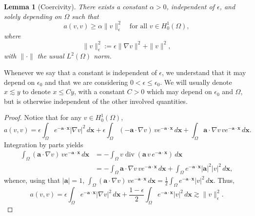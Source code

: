 \documentclass{article}
\newtheorem{lemma}[thm]{Lemma}
\newcommand{\aaa}{\ensuremath{\mathbf{a}}\xspace}
\newcommand{\xxx}{\ensuremath{\mathbf{x}}\xspace}
\DeclareMathOperator{\Div}{div}
\newcommand{\qtfa}{\quad\text{for all }}
\newcommand{\Hoi}[1][\Omega]{\ensuremath{H_0^1(#1)}\xspace}
\newcommand{\intO}{\int_\Omega}
\begin{document}
\begin{lemma}[Coercivity]
\label{Lemma:Coercivity}
There exists a constant $\alpha > 0$, independent of $\epsilon$, and solely depending on $\Omega$ such that
$$
 a(v,v) \ge \alpha \| v\|_\epsilon^2\qtfa v \in \Hoi,
$$
where
\begin{equation}
\label{eq:epsnorm}
  \| v \|_\epsilon^2 := \epsilon \| \nabla v\|^2 + \|v\|^2,
\end{equation}
with $\| \cdot \|$ the usual $L^2(\Omega)$ norm.
\end{lemma}

Whenever we say that a constant is independent of $\epsilon$, we understand that it may depend on $\epsilon_0$ and that we are considering $0<\epsilon\le\epsilon_0$.
We will usually denote $x \lesssim y$ to denote $x\le C y$, with a constant $C>0$ which may depend on $\epsilon_0$ and $\Omega$, but is otherwise independent of the other involved quantities. 

\begin{proof}
Notice that for any $v\in \Hoi$,
$$
  a(v,v) = \epsilon\int_\Omega e^{-\aaa\cdot \xxx} |\nabla v|^2\, d\xxx + \epsilon \intO (-\aaa \cdot \nabla v) \, v e^{-\aaa\cdot \xxx}\, d\xxx
     + \intO \aaa \cdot \nabla v \, v e^{-\aaa\cdot \xxx}\,d\xxx.
$$
Integration by parts yields
\begin{equation*}
\begin{aligned}
  \intO (\aaa \cdot \nabla v) \, v e^{-\aaa\cdot \xxx}\, d\xxx 
   &= -\intO v \Div(\aaa \, v\, e^{-\aaa\cdot \xxx}) \, d\xxx 
  \\
&= -\intO \aaa \cdot \nabla v \, v e^{-\aaa\cdot\xxx} \, d\xxx
+ \intO e^{-\aaa \cdot \xxx} |\aaa|^2 |v|^2 \, d\xxx,
\end{aligned}
\end{equation*}
whence, using that $|\aaa|=1$,
$  \intO (\aaa \cdot \nabla v) \, v e^{-\aaa\cdot \xxx}\, d\xxx 
   = \frac12
\intO e^{-\aaa \cdot \xxx} |v|^2 \, d\xxx$.
Thus,
\begin{equation}
  a(v,v) = \epsilon\int_\Omega e^{-\aaa\cdot \xxx} |\nabla v|^2 \,d\xxx
  + \frac{1-\epsilon}{2} \intO e^{-\aaa\cdot \xxx} |v|^2\,d \xxx
  \gtrsim \| v\|_\epsilon^2.
  \tag*{\qedhere}
\end{equation}
\end{proof}
\end{document}
